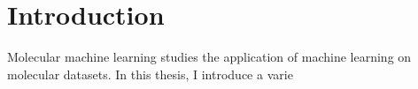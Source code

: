 \section{Introduction}

Molecular machine learning studies the application of machine learning on molecular datasets. In this thesis, I introduce a varie
